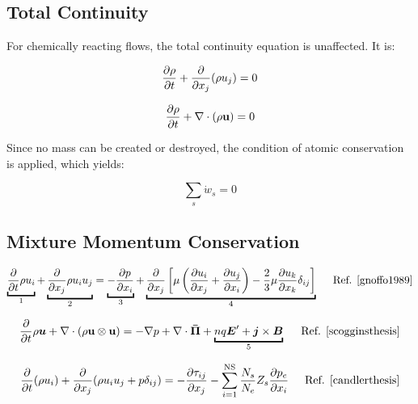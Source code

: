 \documentclass[10pt]{article}
\begin{document}
\begin{flushleft}
\subsection{Total Continuity}
For chemically reacting flows, the total continuity equation is unaffected. It is:


\begin{equation*}
    \frac{\partial \rho}{\partial t} + \frac{\partial }{\partial x_j} (\rho u_j) = 0
\end{equation*}

\begin{equation}
    \frac{\partial \rho}{\partial t} + \nabla \cdot (\rho \textbf{u}) = 0
\end{equation}

Since no mass can be created or destroyed, the condition of atomic conservation is applied, which yields:

\begin{equation}
    \sum_{s} \dot{w}_s = 0
\end{equation}

\subsection{Mixture Momentum Conservation}

\begin{equation}
    \underbracket{\pd{}{t} \rho u_i}_{1} + \underbracket{\pd{}{x_j} \rho u_i u_j}_{2} = \underbracket{-\pd{p}{x_i}}_{3} + \underbracket{\pd{}{x_j} \left[ \mu \left( \pd{u_i}{x_j} + \pd{u_j}{x_i} \right) - \frac{2}{3} \mu \pd{u_k}{x_k} \delta_{ij} \right]}_4 \hspace{5mm} \text{Ref. \cite{gnoffo1989}}
\end{equation}

\begin{equation*}
    \pd{}{t} \rho \boldsymbol{u} + \nabla \cdot (\rho \textbf{u} \otimes \textbf{u}) = -\nabla p + \nabla \cdot \boldsymbol{\bar{\Pi}} + \ub{nq\boldsymbol{E}' + \boldsymbol{j} \times \boldsymbol{B}}{5} \hspace{5mm} \text{Ref. \cite{scogginsthesis}}
\end{equation*}

\begin{equation*}
    \frac{\partial }{\partial t} (\rho u_i) + \frac{\partial }{\partial x_j} (\rho u_i u_j + p \delta_{ij}) = - \frac{\partial \tau_{ij}}{\partial x_j} - \sum_{i=1}^\text{NS} \frac{N_s}{N_e} Z_s \frac{\partial p_e}{\partial x_i} \hspace{5mm} \text{Ref. \cite{candlerthesis}}
\end{equation*}


\end{flushleft}
\end{document}
